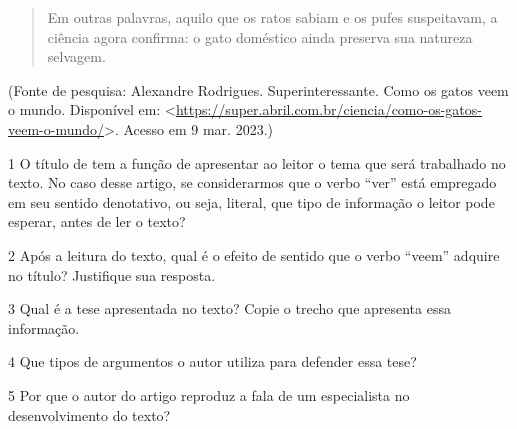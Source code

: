 {\begin{quote}
Em outras palavras, aquilo que os ratos sabiam e os pufes suspeitavam, a
ciência agora confirma: o gato doméstico ainda preserva sua natureza
selvagem.
\end{quote}

(Fonte de pesquisa: Alexandre Rodrigues. Superinteressante. Como os
gatos veem o mundo. Disponível em:
\textless{}\url{https://super.abril.com.br/ciencia/como-os-gatos-veem-o-mundo/}\textgreater.
Acesso em 9 mar. 2023.)

\num{1} O título de tem a função de apresentar ao leitor o tema que será
trabalhado no texto. No caso desse artigo, se considerarmos que o verbo
``ver'' está empregado em seu sentido denotativo, ou seja, literal, que
tipo de informação o leitor pode esperar, antes de ler o texto?



\num{2} Após a leitura do texto, qual é o efeito de sentido que o verbo
``veem'' adquire no título? Justifique sua resposta.



\num{3} Qual é a tese apresentada no texto? Copie o trecho que apresenta
essa informação.



\num{4} Que tipos de argumentos o autor utiliza para defender essa tese?



\num{5} Por que o autor do artigo reproduz a fala de um especialista no
desenvolvimento do texto?



}
